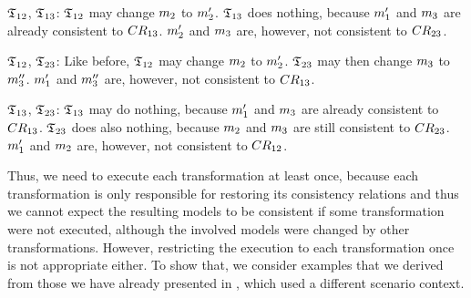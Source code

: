 \begin{properdescription}
    \item[$\mathfrak{T}_{12}$, $\mathfrak{T}_{13}$:] 
    $\mathfrak{T}_{12}$ may change $m_{2}$ to $m_{2}'$. $\mathfrak{T}_{13}$ does nothing, because $m_{1}'$ and $m_{3}$ are already consistent to $CR_{13}$.
    $m_{2}'$ and $m_{3}$ are, however, not consistent to $CR_{23}$.
    \item[$\mathfrak{T}_{12}$, $\mathfrak{T}_{23}$:] 
    Like before, $\mathfrak{T}_{12}$ may change $m_{2}$ to $m_{2}'$. 
    $\mathfrak{T}_{23}$ may then change $m_{3}$ to $m_{3}''$. 
    $m_{1}'$ and $m_{3}''$ are, however, not consistent to $CR_{13}$.
    \item[$\mathfrak{T}_{13}$, $\mathfrak{T}_{23}$:]
    $\mathfrak{T}_{13}$ may do nothing, because $m_{1}'$ and $m_{3}$ are already consistent to $CR_{13}$.
    $\mathfrak{T}_{23}$ does also nothing, because $m_{2}$ and $m_{3}$ are still consistent to $CR_{23}$.
    $m_{1}'$ and $m_{2}$ are, however, not consistent to $CR_{12}$.
\end{properdescription}

Thus, we need to execute each transformation at least once, because each transformation is only responsible for restoring its consistency relations and thus we cannot expect the resulting models to be consistent if some transformation were not executed, although the involved models were changed by other transformations.
However, restricting the execution to each transformation once is not appropriate either.
To show that, we consider examples that we derived from those we have already presented in , which used a different scenario context.

